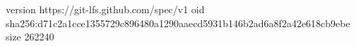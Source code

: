 version https://git-lfs.github.com/spec/v1
oid sha256:d71c2a1cce1355729c896480a1290aaecd5931b146b2ad6a8f2a42e618cb9ebe
size 262240
